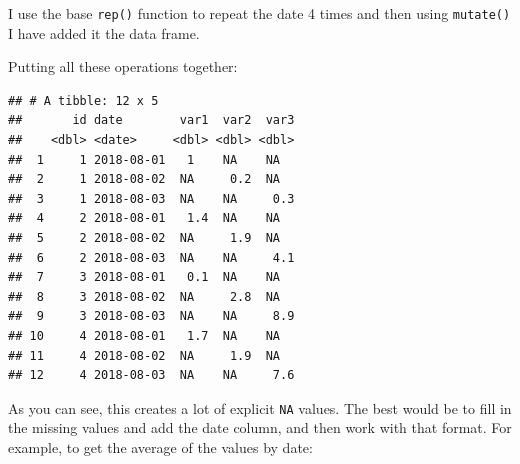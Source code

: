 \documentclass[]{gitbook}
\newenvironment{Shaded}{\begin{snugshade}}{\end{snugshade}}
\newcommand{\DataTypeTok}[1]{\textcolor[rgb]{0.13,0.29,0.53}{#1}}
\newcommand{\DecValTok}[1]{\textcolor[rgb]{0.00,0.00,0.81}{#1}}
\newcommand{\KeywordTok}[1]{\textcolor[rgb]{0.13,0.29,0.53}{\textbf{#1}}}
\newcommand{\NormalTok}[1]{#1}
\newcommand{\OperatorTok}[1]{\textcolor[rgb]{0.81,0.36,0.00}{\textbf{#1}}}
\newcommand{\StringTok}[1]{\textcolor[rgb]{0.31,0.60,0.02}{#1}}
\theoremstyle{definition}
\theoremstyle{definition}
\theoremstyle{definition}
\theoremstyle{remark}
\begin{document}
I use the base \texttt{rep()} function to repeat the date 4 times and
then using \texttt{mutate()} I have added it the data frame.

Putting all these operations together:

\begin{Shaded}
\end{Shaded}

\begin{verbatim}
## # A tibble: 12 x 5
##       id date        var1  var2  var3
##    <dbl> <date>     <dbl> <dbl> <dbl>
##  1     1 2018-08-01   1    NA    NA  
##  2     1 2018-08-02  NA     0.2  NA  
##  3     1 2018-08-03  NA    NA     0.3
##  4     2 2018-08-01   1.4  NA    NA  
##  5     2 2018-08-02  NA     1.9  NA  
##  6     2 2018-08-03  NA    NA     4.1
##  7     3 2018-08-01   0.1  NA    NA  
##  8     3 2018-08-02  NA     2.8  NA  
##  9     3 2018-08-03  NA    NA     8.9
## 10     4 2018-08-01   1.7  NA    NA  
## 11     4 2018-08-02  NA     1.9  NA  
## 12     4 2018-08-03  NA    NA     7.6
\end{verbatim}

As you can see, this creates a lot of explicit \texttt{NA} values. The
best would be to fill in the missing values and add the date column, and
then work with that format. For example, to get the average of the
values by date:

\begin{Shaded}
\end{Shaded}
\end{document}
